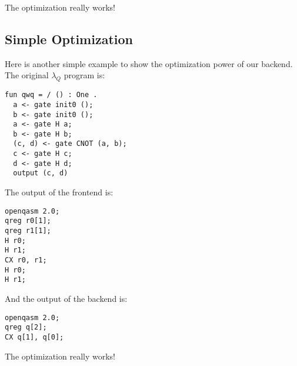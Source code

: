 The optimization really works!

\subsection{Simple Optimization}
Here is another simple example to show the optimization power of our backend.
The original $\lambda_Q$ program is:
\begin{lstlisting}[language=lambda]
fun qwq = / () : One .
  a <- gate init0 ();
  b <- gate init0 ();
  a <- gate H a;
  b <- gate H b;
  (c, d) <- gate CNOT (a, b);
  c <- gate H c;
  d <- gate H d;
  output (c, d)
\end{lstlisting}

The output of the frontend is:
\begin{lstlisting}[language=lambda]
openqasm 2.0;
qreg r0[1];
qreg r1[1];
H r0;
H r1;
CX r0, r1;
H r0;
H r1;
\end{lstlisting}

And the output of the backend is:
\begin{lstlisting}[language=lambda]
openqasm 2.0;
qreg q[2];
CX q[1], q[0];
\end{lstlisting}

The optimization really works!